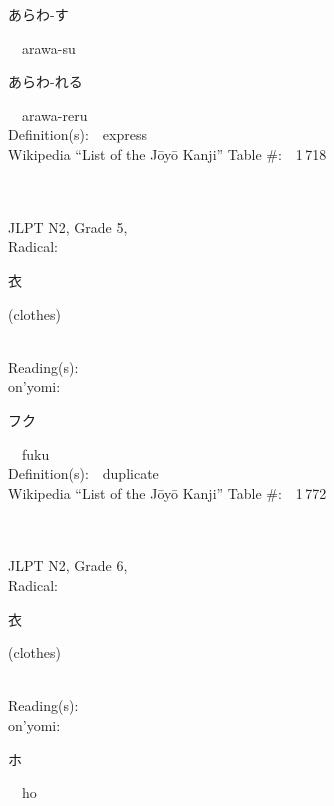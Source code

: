 \begin{multicols}{2}
{\hspace*{2em}}{\begin{CJK}{UTF8}{min} あらわ-す \end{CJK}}\ \ arawa-su\ \ \\
{\hspace*{2em}}{\begin{CJK}{UTF8}{min} あらわ-れる \end{CJK}}\ \ arawa-reru\ \ \\
Definition(s):\ \ express \\
Wikipedia ``List of the J\=oy\=o Kanji'' Table \#:\ \ 1\,718 \\
\ \ \\
{\fontsize{34pt}{40pt}  }\ \ \\  %
{JLPT N2, Grade 5, \\Radical:\ \ {\begin{CJK}{UTF8}{min} 衣 \end{CJK}} (clothes) } \\
Reading(s):\ \ \\
{\hspace*{1em}}on'yomi:\ \ \\
{\hspace*{2em}}{\begin{CJK}{UTF8}{min} フク \end{CJK}}\ \ fuku\ \ \\
Definition(s):\ \ duplicate \\
Wikipedia ``List of the J\=oy\=o Kanji'' Table \#:\ \ 1\,772 \\
\ \ \\
{\fontsize{34pt}{40pt}  }\ \ \\  %
{JLPT N2, Grade 6, \\Radical:\ \ {\begin{CJK}{UTF8}{min} 衣 \end{CJK}} (clothes) } \\
Reading(s):\ \ \\
{\hspace*{1em}}on'yomi:\ \ \\
{\hspace*{2em}}{\begin{CJK}{UTF8}{min} ホ \end{CJK}}\ \ ho\ \ \\

\end{multicols}
